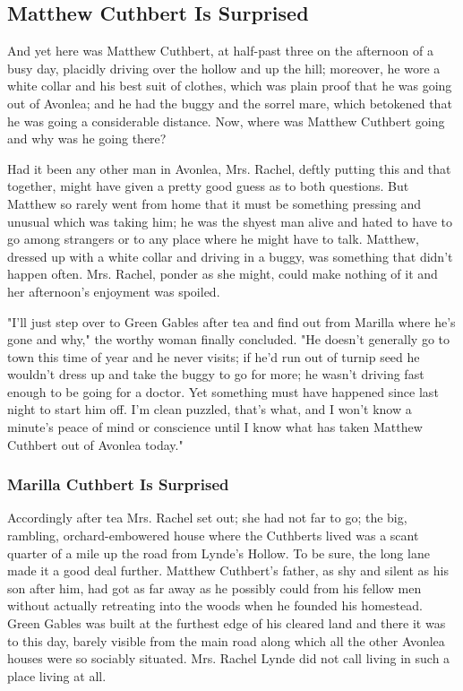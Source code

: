 \documentclass{article}
\begin{document}
\subsection{Matthew Cuthbert Is Surprised}
And yet here was Matthew Cuthbert, at half-past three on the afternoon of a busy day, placidly driving over the hollow and up the hill; moreover, he wore a white collar and his best suit of clothes, which was plain proof that he was going out of Avonlea; and he had the buggy and the sorrel mare, which betokened that he was going a considerable distance. Now, where was Matthew Cuthbert going and why was he going there?

Had it been any other man in Avonlea, Mrs. Rachel, deftly putting this and that together, might have given a pretty good guess as to both questions. But Matthew so rarely went from home that it must be something pressing and unusual which was taking him; he was the shyest man alive and hated to have to go among strangers or to any place where he might have to talk. Matthew, dressed up with a white collar and driving in a buggy, was something that didn't happen often. Mrs. Rachel, ponder as she might, could make nothing of it and her afternoon's enjoyment was spoiled.

"I'll just step over to Green Gables after tea and find out from Marilla where he's gone and why," the worthy woman finally concluded. "He doesn't generally go to town this time of year and he never visits; if he'd run out of turnip seed he wouldn't dress up and take the buggy to go for more; he wasn't driving fast enough to be going for a doctor. Yet something must have happened since last night to start him off. I'm clean puzzled, that's what, and I won't know a minute's peace of mind or conscience until I know what has taken Matthew Cuthbert out of Avonlea today."

\subsubsection{Marilla Cuthbert Is Surprised}
Accordingly after tea Mrs. Rachel set out; she had not far to go; the big, rambling, orchard-embowered house where the Cuthberts lived was a scant quarter of a mile up the road from Lynde's Hollow. To be sure, the long lane made it a good deal further. Matthew Cuthbert's father, as shy and silent as his son after him, had got as far away as he possibly could from his fellow men without actually retreating into the woods when he founded his homestead. Green Gables was built at the furthest edge of his cleared land and there it was to this day, barely visible from the main road along which all the other Avonlea houses were so sociably situated. Mrs. Rachel Lynde did not call living in such a place living at all.
\end{document}
